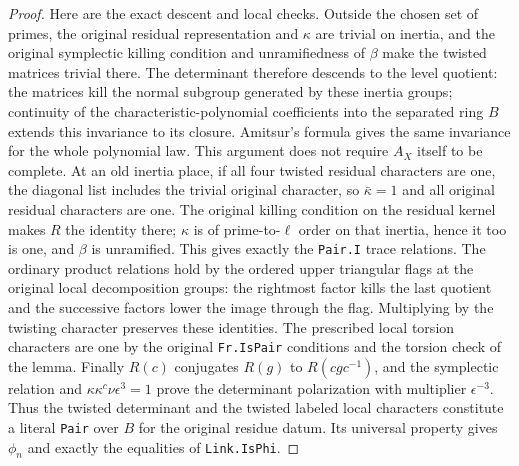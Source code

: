 \begin{proof}
Here are the exact descent and local checks. Outside the
chosen set of primes, the original residual representation
and $\kappa$ are trivial on inertia, and the original
symplectic killing condition and unramifiedness of $\beta$
make the twisted matrices trivial there. The determinant
therefore descends to the level quotient: the matrices kill
the normal subgroup generated by these inertia groups;
continuity of the characteristic-polynomial coefficients
into the separated ring $B$ extends this invariance to
its closure. Amitsur's formula gives the same invariance
for the whole polynomial law. This argument does not
require $A_X$ itself to be complete. At an old inertia
place, if all four twisted residual characters are one,
the diagonal list includes the trivial original character,
so $\bar\kappa=1$ and all original residual characters
are one. The original killing condition on the residual
kernel makes $R$ the identity there; $\kappa$ is of
prime-to-$\ell$ order on that inertia, hence it too is
one, and $\beta$ is unramified. This gives exactly the
\texttt{Pair.I} trace relations. The ordinary product
relations hold by the ordered upper triangular flags at
the original local decomposition groups: the rightmost
factor kills the last quotient and the successive factors
lower the image through the flag. Multiplying by the
twisting character preserves these identities. The
prescribed local torsion characters are one by the original
\texttt{Fr.IsPair} conditions and the torsion check of the
lemma. Finally $R(c)$ conjugates $R(g)$ to $R(cgc^{-1})$,
and the symplectic relation and
$\kappa\kappa^c\nu\epsilon^3=1$ prove the determinant
polarization with multiplier $\epsilon^{-3}$. Thus the
twisted determinant and the twisted labeled local characters
constitute a literal \texttt{Pair} over $B$ for the
original residue datum. Its universal property gives
$\phi_n$ and exactly the equalities of \texttt{Link.IsPhi}.
\end{proof}

